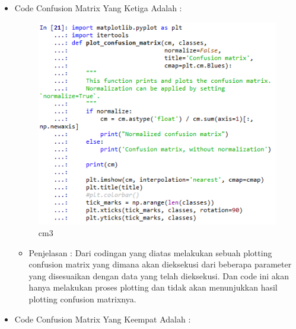 \begin{enumerate}
\begin{itemize}
\begin{itemize}
\par
\end{itemize}
\item Code Confusion Matrix Yang Ketiga Adalah :
\par
\begin{figure}[ht]
\centering
\includegraphics[scale=0.2]{figures/cm3.png}
\caption{cm3}
\label{contoh}
\end{figure}
\par
\begin{itemize}
\item Penjelasan : Dari codingan yang diatas melakukan sebuah plotting confusion matrix yang dimana akan dieksekusi dari beberapa parameter yang disesuaikan dengan data yang telah dieksekusi. Dan code ini akan hanya melakukan proses plotting dan tidak akan menunjukkan hasil plotting confusion matrixnya.
\par
\par
\end{itemize}
\item Code Confusion Matrix Yang Keempat Adalah :
\par
\begin{figure}[ht]
\centering

\end{figure}
\end{itemize}
\end{enumerate}
